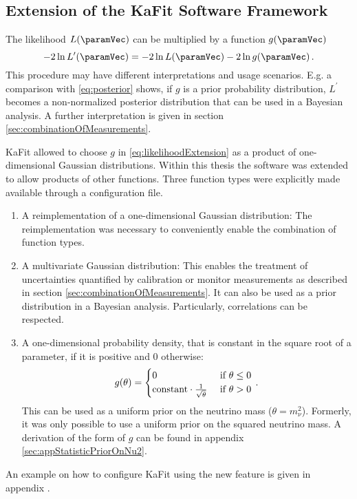 
\subsection{Extension of the KaFit Software Framework}
\label{sec:statLikelihoodExtImpl}
The likelihood $L(\paramVec)$ can be multiplied by a function $g(\paramVec)$
\begin{equation}
\label{eq:likelihoodExtension}
-2\ln L^\prime(\paramVec) = -2\ln L(\paramVec) -2\ln g(\paramVec)
\fullstop
\end{equation}
This procedure may have different interpretations and usage scenarios. E.g. a comparison with \eqref{eq:posterior} shows, if $g$ is a prior probability distribution, $L^\prime$ becomes a non-normalized posterior distribution that can be used in a Bayesian analysis. A further interpretation is given in section \ref{sec:combinationOfMeasurements}.
\label{sec:combinationOfMeasurements}

KaFit allowed to choose $g$ in \ref{eq:likelihoodExtension} as a product of one-dimensional Gaussian distributions. Within this thesis the software was extended to allow products of other functions. Three function types were explicitly made available through a configuration file.
\begin{enumerate}
	\item A reimplementation of a one-dimensional Gaussian distribution: The reimplementation was necessary to conveniently enable the combination of function types.
	\item A multivariate Gaussian distribution: This enables the treatment of uncertainties quantified by calibration or monitor measurements as described in section \ref{sec:combinationOfMeasurements}. It can also be used as a prior distribution in a Bayesian analysis. Particularly, correlations can be respected.
	\item A one-dimensional probability density, that is constant in the square root of a parameter, if it is positive and 0 otherwise:
	\begin{equation}
		g(\theta) =
		\begin{cases}
		0 &\text{ if } \theta \leq 0 \\
		\text{constant} \cdot \frac{1}{\sqrt{\theta}} &\text{ if } \theta > 0
		\end{cases}
		\text{\,.}
	\end{equation}
	 This can be used as a uniform prior on the neutrino mass ($\theta=m_\nu^2$). Formerly, it was only possible to use a uniform prior on the squared neutrino mass. A derivation of the form of $g$ can be found in appendix \ref{sec:appStatisticPriorOnNu2}.
\end{enumerate}
An example on how to configure KaFit using the new feature is given in appendix .
